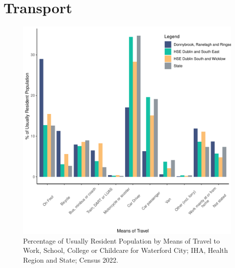 \documentclass{article}
\begin{document}
\section{Transport}\label{sect:Trans}
\begin{figure}[H]
	\centering
	\includegraphics[width = 120mm]{../figures/TravelED.pdf}
	\caption{Percentage of Usually Resident Population by Means of Travel to Work, School, College or Childcare for Waterford City; IHA, Health Region and State; Census 2022.}
	\label{fig:vbnv}
	\end{figure}
\end{document}
